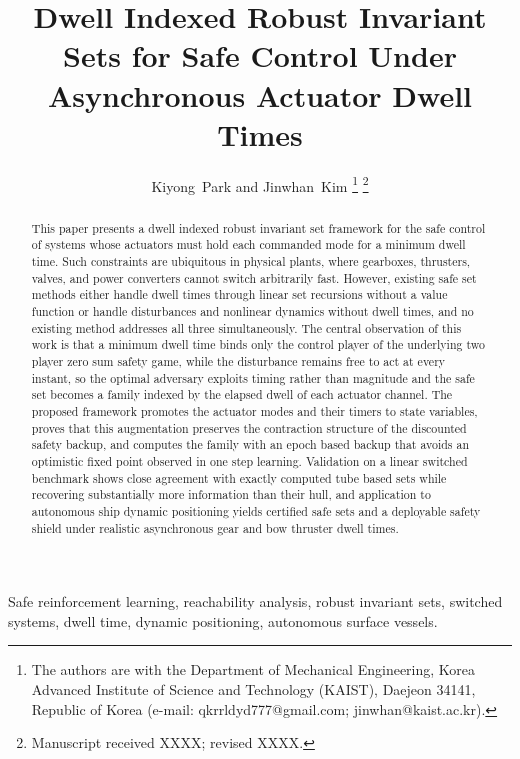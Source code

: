 \documentclass[journal]{IEEEtran}
\begin{document}
\title{Dwell Indexed Robust Invariant Sets for Safe Control Under Asynchronous Actuator Dwell Times}

\author{Kiyong~Park and Jinwhan~Kim%
\thanks{The authors are with the Department of Mechanical Engineering, Korea Advanced Institute of Science and Technology (KAIST), Daejeon 34141, Republic of Korea (e-mail: qkrrldyd777@gmail.com; jinwhan@kaist.ac.kr).}%
\thanks{Manuscript received XXXX; revised XXXX.}}

\maketitle

\begin{abstract}
This paper presents a dwell indexed robust invariant set framework for the safe control of systems whose actuators must hold each commanded mode for a minimum dwell time. Such constraints are ubiquitous in physical plants, where gearboxes, thrusters, valves, and power converters cannot switch arbitrarily fast. However, existing safe set methods either handle dwell times through linear set recursions without a value function or handle disturbances and nonlinear dynamics without dwell times, and no existing method addresses all three simultaneously. The central observation of this work is that a minimum dwell time binds only the control player of the underlying two player zero sum safety game, while the disturbance remains free to act at every instant, so the optimal adversary exploits timing rather than magnitude and the safe set becomes a family indexed by the elapsed dwell of each actuator channel. The proposed framework promotes the actuator modes and their timers to state variables, proves that this augmentation preserves the contraction structure of the discounted safety backup, and computes the family with an epoch based backup that avoids an optimistic fixed point observed in one step learning. Validation on a linear switched benchmark shows close agreement with exactly computed tube based sets while recovering substantially more information than their hull, and application to autonomous ship dynamic positioning yields certified safe sets and a deployable safety shield under realistic asynchronous gear and bow thruster dwell times.
\end{abstract}

\begin{IEEEkeywords}
Safe reinforcement learning, reachability analysis, robust invariant sets, switched systems, dwell time, dynamic positioning, autonomous surface vessels.
\end{IEEEkeywords}
\end{document}
